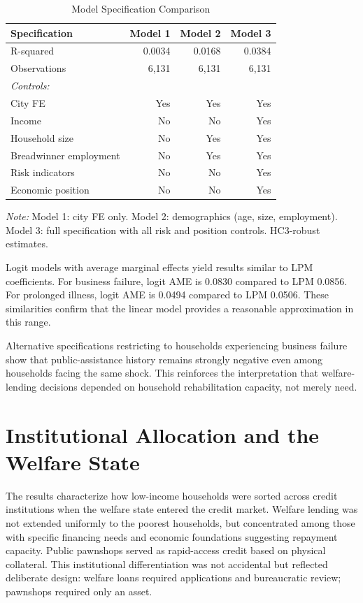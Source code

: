 \documentclass[12pt,a4paper]{article}
\begin{document}
\begin{table}[!h]
\centering
\small
\caption{Model Specification Comparison}
\label{tab:specs}
\begin{tabular}{lrrr}
\toprule
Specification & Model 1 & Model 2 & Model 3 \\
\midrule
R-squared & 0.0034 & 0.0168 & 0.0384 \\
Observations & 6,131 & 6,131 & 6,131 \\
\midrule
\multicolumn{4}{l}{\emph{Controls:}} \\
City FE & Yes & Yes & Yes \\
Income & No & No & Yes \\
Household size & No & Yes & Yes \\
Breadwinner employment & No & Yes & Yes \\
Risk indicators & No & No & Yes \\
Economic position & No & No & Yes \\
\bottomrule
\end{tabular}

\noindent\small\emph{Note:} Model 1: city FE only. Model 2: demographics (age, size, employment). Model 3: full specification with all risk and position controls. HC3-robust estimates.
\end{table}

Logit models with average marginal effects yield results similar to LPM coefficients. For business failure, logit AME is 0.0830 compared to LPM 0.0856. For prolonged illness, logit AME is 0.0494 compared to LPM 0.0506. These similarities confirm that the linear model provides a reasonable approximation in this range.

Alternative specifications restricting to households experiencing business failure show that public-assistance history remains strongly negative even among households facing the same shock. This reinforces the interpretation that welfare-lending decisions depended on household rehabilitation capacity, not merely need.

\section{Institutional Allocation and the Welfare State}

The results characterize how low-income households were sorted across credit institutions when the welfare state entered the credit market. Welfare lending was not extended uniformly to the poorest households, but concentrated among those with specific financing needs and economic foundations suggesting repayment capacity. Public pawnshops served as rapid-access credit based on physical collateral. This institutional differentiation was not accidental but reflected deliberate design: welfare loans required applications and bureaucratic review; pawnshops required only an asset.
\end{document}
